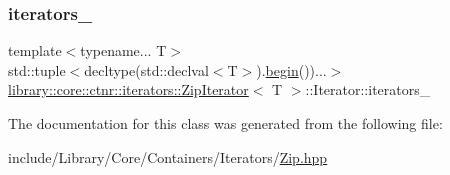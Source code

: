 \subsubsection{\texorpdfstring{iterators\_}{iterators\_}}
{\footnotesize\ttfamily template$<$typename... T$>$ \\
std\+::tuple$<$decltype(std\+::declval$<$T$>$).\mbox{\hyperlink{classlibrary_1_1core_1_1ctnr_1_1iterators_1_1_zip_iterator_a0467e25b565ac7b73b22a7002b87d189}{begin}}())...$>$ \mbox{\hyperlink{classlibrary_1_1core_1_1ctnr_1_1iterators_1_1_zip_iterator}{library\+::core\+::ctnr\+::iterators\+::\+Zip\+Iterator}}$<$ T $>$\+::Iterator\+::iterators\+\_\+}



The documentation for this class was generated from the following file\+:\begin{DoxyCompactItemize}
\item 
include/\+Library/\+Core/\+Containers/\+Iterators/\mbox{\hyperlink{_zip_8hpp}{Zip.\+hpp}}\end{DoxyCompactItemize}
